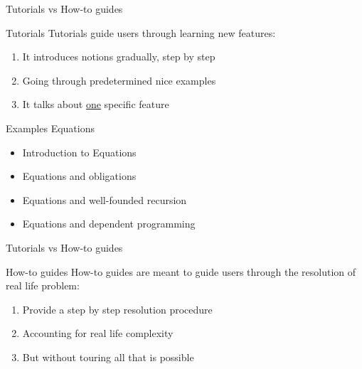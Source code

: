 \documentclass[10pt]{beamer}
\begin{document}
\begin{frame}{Tutorials vs How-to guides}
  \begin{tcbProp}{Tutorials}
      Tutorials guide users through learning new features:
      \begin{enumerate}
        \item It introduces notions gradually, step by step
        \item Going through predetermined nice examples
        \item It talks about \ul{one} specific feature
      \end{enumerate}
  \end{tcbProp}
  \begin{tcbEx}{Examples Equations}
    \begin{itemize}[label=$-$]
      \item Introduction to Equations
      \item Equations and obligations
      \item Equations and well-founded recursion
      \item Equations and dependent programming
    \end{itemize}
  \end{tcbEx}
\end{frame}

\begin{frame}{Tutorials vs How-to guides}
  \begin{tcbProp}{How-to guides}
    How-to guides are meant to guide users through the resolution of real life
    problem:
    \begin{enumerate}
        \item Provide a step by step resolution procedure
        \item Accounting for real life complexity
        \item But without touring all that is possible
      \end{enumerate}
  \end{tcbProp}
\end{frame}
\end{document}

